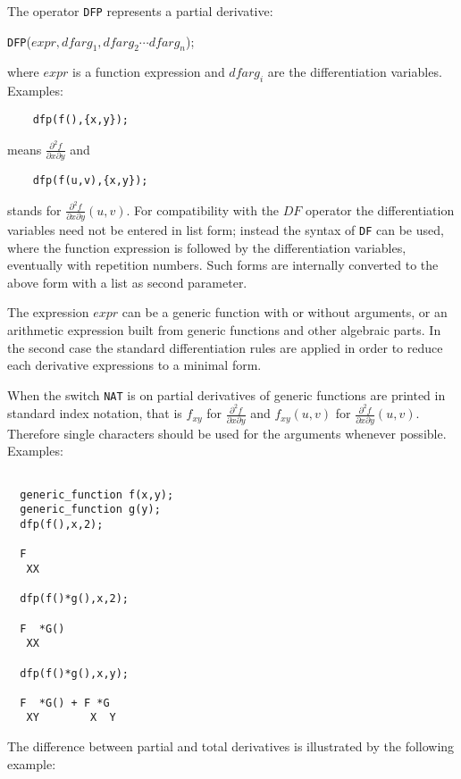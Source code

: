 \documentclass[11pt,letterpaper]{book}
\makeatletter
\newcommand{\underscore}{\_}
\newcommand{\ttindex}[1]{{\renewcommand{\_}{\protect\underscore}%
                          \index{#1@{\tt #1}}}}
\makeatother
\begin{document}
The operator {\tt DFP}\ttindex{DFP} represents a partial derivative:

\vspace{.1in}
 {\tt DFP}($expr,{dfarg_1,dfarg_2\cdots dfarg_n}$);
\vspace{.1in}

\noindent
where $expr$ is a function expression and $dfarg_i$ are
the differentiation variables. Examples:

{\small\begin{verbatim}
    dfp(f(),{x,y});
\end{verbatim}}
means $\frac{\partial ^2 f}{\partial x \partial y}$ and
{\small\begin{verbatim}
    dfp(f(u,v),{x,y});
\end{verbatim}}
stands for $\frac{\partial ^2 f}{\partial x \partial y} (u,v)$.
For compatibility with the $DF$ operator the differentiation
variables need not be entered in list form; instead the syntax
of {\tt DF} can be used, where the function expression is followed
by the differentiation variables, eventually with repetition
numbers. Such forms are internally converted to the above
form with a list as second parameter.

The expression $expr$ can be a generic function
with or without arguments, or an arithmetic expression built
from generic functions and other algebraic parts. In the
second case the standard differentiation rules are applied
in order to reduce each derivative expressions to a minimal
form.

When the switch {\tt NAT} is on partial derivatives of generic
functions are printed in standard index notation, that is
$f_{xy}$ for $\frac{\partial ^2 f}{\partial x \partial y}$
and $f_{xy}(u,v)$ for $\frac{\partial ^2 f}{\partial x \partial y}(u,v)$.
Therefore single characters should be used for the arguments
whenever possible. Examples:

{\small\begin{verbatim}

  generic_function f(x,y);
  generic_function g(y);
  dfp(f(),x,2);

  F
   XX

  dfp(f()*g(),x,2);

  F  *G()
   XX

  dfp(f()*g(),x,y);

  F  *G() + F *G
   XY        X  Y

\end{verbatim}}

The difference between partial and total derivatives is
illustrated by the following example:
\end{document}
